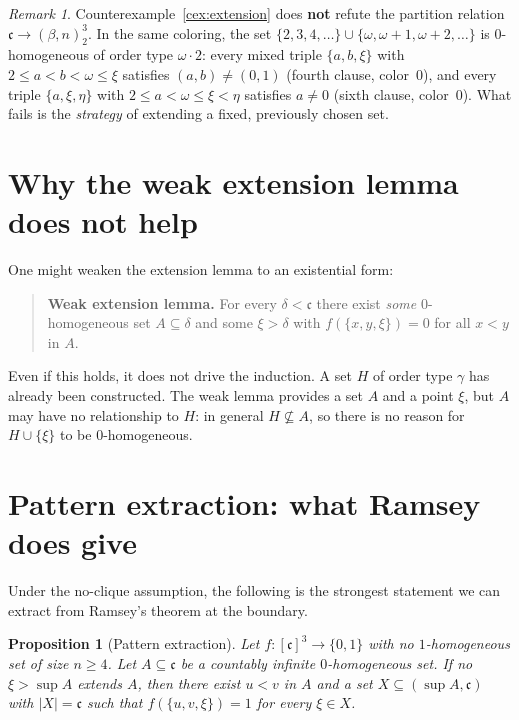 \documentclass[11pt]{article}
\newtheorem{proposition}[theorem]{Proposition}
\theoremstyle{definition}
\theoremstyle{remark}
\newtheorem{remark}[theorem]{Remark}
\newcommand{\cc}{\mathfrak{c}}
\begin{document}
\begin{remark}
\label{rmk:not-refutation}
Counterexample~\ref{cex:extension} does \textbf{not} refute the partition relation $\cc\to(\beta,n)^3_2$. In the same coloring, the set $\{2,3,4,\ldots\}\cup\{\omega,\omega{+}1,\omega{+}2,\ldots\}$ is $0$-homogeneous of order type $\omega\cdot 2$: every mixed triple $\{a,b,\xi\}$ with $2\le a<b<\omega\le\xi$ satisfies $(a,b)\ne(0,1)$ (fourth clause, color~$0$), and every triple $\{a,\xi,\eta\}$ with $2\le a<\omega\le\xi<\eta$ satisfies $a\ne 0$ (sixth clause, color~$0$). What fails is the \emph{strategy} of extending a fixed, previously chosen set.
\end{remark}

\section{Why the weak extension lemma does not help}

One might weaken the extension lemma to an existential form:

\begin{quote}
\textbf{Weak extension lemma.} For every $\delta<\cc$ there exist \emph{some} $0$-homogeneous set $A\subseteq\delta$ and some $\xi>\delta$ with $f(\{x,y,\xi\})=0$ for all $x<y$ in $A$.
\end{quote}

Even if this holds, it does not drive the induction. A set $H$ of order type $\gamma$ has already been constructed. The weak lemma provides a set $A$ and a point $\xi$, but $A$ may have no relationship to $H$: in general $H\not\subseteq A$, so there is no reason for $H\cup\{\xi\}$ to be $0$-homogeneous.

\section{Pattern extraction: what Ramsey does give}

Under the no-clique assumption, the following is the strongest statement we can extract from Ramsey's theorem at the boundary.

\begin{proposition}[Pattern extraction]
\label{prop:pattern}
Let $f:[\cc]^3\to\{0,1\}$ with no $1$-homogeneous set of size $n\ge 4$. Let $A\subseteq\cc$ be a countably infinite $0$-homogeneous set. If no $\xi>\sup A$ extends $A$, then there exist $u<v$ in $A$ and a set $X\subseteq(\sup A,\cc)$ with $|X|=\cc$ such that $f(\{u,v,\xi\})=1$ for every $\xi\in X$.
\end{proposition}
\end{document}
